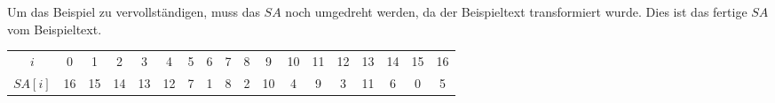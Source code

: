 Um das Beispiel zu vervollständigen, muss das $SA$ noch umgedreht werden, da der Beispieltext transformiert wurde. Dies ist das fertige $SA$ vom Beispieltext.

\begin{table}[H]
	\footnotesize
	\centering
	\begin{tabular}{c| c c c c c c c c c c c c c c c c c}
		$i$ & 0 & 1 & 2 & 3 & 4 & 5 & 6 & 7 & 8 & 9 & 10 & 11 & 12 & 13 & 14 & 15 & 16 \\
		$SA[i]$ & 16 & 15 & 14 & 13 & 12 & 7 & 1 & 8 & 2 & 10 & 4 & 9 & 3 & 11 & 6 & 0 & 5 
	\end{tabular}
\end{table}
